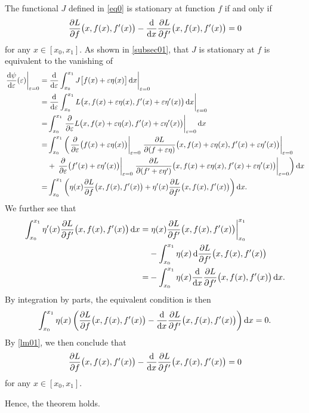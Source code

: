   The functional \(J\) defined in \autoref{eq0} is stationary at function \(f\) if and only if
  \[
    \frac{\partial L}{\partial f}\big(x, f(x), f'(x)\big) - \frac{\mathop{}\!\mathrm{d}}{\mathop{}\!\mathrm{d} x} \frac{\partial L}{\partial f'}\big(x,
    f(x), f'(x)\big) = 0
  \]
  for any \(x \in [x_0, x_1]\).
\Eth
\Bpr
  As shown in \autoref{subsec01}, that \(J\) is stationary at \(f\) is equivalent to the vanishing of
  {\allowdisplaybreaks
    \begin{align*}
      \left.\frac{\diff \psi}{\diff \varepsilon}(\varepsilon)\right|_{\varepsilon = 0}
      = & \left.\frac{\diff}{\diff \varepsilon} \int_{x_0}^{x_1} J\big[f(x) + \varepsilon \eta(x)\big]
      \diff x\right|_{\varepsilon = 0}\\
      = & \left.\frac{\diff}{\diff \varepsilon} \int_{x_0}^{x_1} L\big(x, f(x) + \varepsilon \eta(x), f'(x) + \varepsilon
      \eta'(x)\big) \diff x\right|_{\varepsilon = 0}\\
      = & \int_{x_0}^{x_1} \left.\frac{\partial}{\partial \varepsilon} L\big(x, f(x) + \varepsilon \eta(x), f'(x)
      + \varepsilon \eta'(x)\big)\right|_{\varepsilon = 0} \diff x\\
      = & \int_{x_0}^{x_1} \left(\left.\frac{\partial}{\partial \varepsilon}\big(f(x) + \varepsilon
      \eta(x)\big)\right|_{\varepsilon = 0} \left.\frac{\partial L}{\partial (f + \varepsilon \eta)}\big(x, f(x)
      + \varepsilon \eta(x), f'(x) + \varepsilon \eta'(x)\big)\right|_{\varepsilon = 0}\right.\\
      & + \left.\left.\frac{\partial}{\partial \varepsilon} \big(f'(x) + \varepsilon \eta'(x)\big)\right|_{\varepsilon
      = 0} \left.\frac{\partial L}{\partial (f' + \varepsilon \eta')}\big(x, f(x) + \varepsilon \eta(x), f'(x)
      + \varepsilon \eta'(x)\big)\right|_{\varepsilon = 0}\right) \diff x\\
      = & \int_{x_0}^{x_1} \left(\eta(x) \frac{\partial L}{\partial f}\big(x, f(x), f'(x)\big) + \eta'(x)
      \frac{\partial L}{\partial f'}\big(x, f(x), f'(x)\big)\right) \diff x.
    \end{align*}
  }
  We further see that
  \begin{align*}
    \int_{x_0}^{x_1} \eta'(x) \frac{\partial L}{\partial f'}\big(x, f(x), f'(x)\big) \mathop{}\!\mathrm{d} x = & \left.\eta(x)
    \frac{\partial L}{\partial f'}\big(x, f(x), f'(x)\big)\right|_{x_0}^{x_1}\\
    & - \int_{x_0}^{x_1} \eta(x) \mathop{}\!\mathrm{d} \frac{\partial L}{\partial f'}\big(x, f(x), f'(x)\big)\\
    = & - \int_{x_0}^{x_1} \eta(x) \frac{\mathop{}\!\mathrm{d}}{\mathop{}\!\mathrm{d} x} \frac{\partial L}{\partial f'}\big(x, f(x), f'(x)\big) \mathop{}\!\mathrm{d} x.
  \end{align*}
  By integration by parts, the equivalent condition is then
  \[
    \int_{x_0}^{x_1} \eta(x) \left(\frac{\partial L}{\partial f}\big(x, f(x), f'(x)\big) - \frac{\mathop{}\!\mathrm{d}}{\mathop{}\!\mathrm{d} x}
    \frac{\partial L}{\partial f'}\big(x, f(x), f'(x)\big)\right) \mathop{}\!\mathrm{d} x = 0.
  \]
  By \autoref{lm01}, we then conclude that
  \[
    \frac{\partial L}{\partial f}\big(x, f(x), f'(x)\big) - \frac{\mathop{}\!\mathrm{d}}{\mathop{}\!\mathrm{d} x} \frac{\partial L}{\partial f'}\big(x,
    f(x), f'(x)\big) = 0
  \]
  for any \(x \in [x_0, x_1]\).

  Hence, the theorem holds.
\Epr

\Edc

